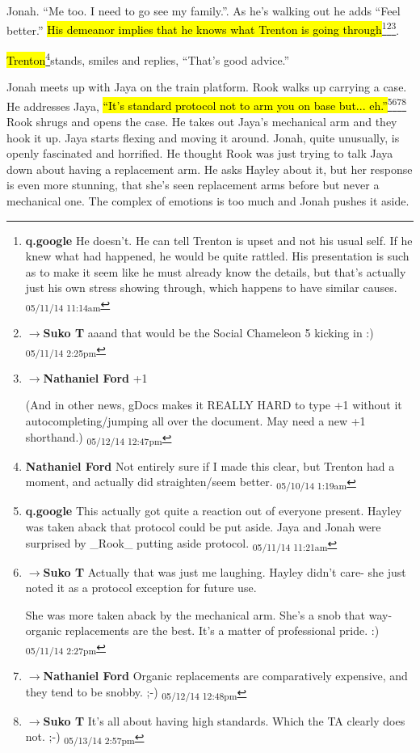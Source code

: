 Jonah.  ``Me too.  I need to go see my family.''.  As he's walking out he adds ``Feel better.''  \hl{His demeanor implies that he knows what Trenton is going through}\footnote{\textbf{q.google }He doesn't.  He can tell Trenton is upset and not his usual self.  If he knew what had happened, he would be quite rattled.  His presentation is such as to make it seem like he must already know the details, but that's actually just his own stress showing through, which happens to have similar causes. \textsubscript{05/11/14 11:14am}}\footnote{$\rightarrow$\textbf{Suko T }aaand that would be the Social Chameleon 5 kicking in :) \textsubscript{05/11/14 2:25pm}}\footnote{$\rightarrow$\textbf{Nathaniel Ford }+1

(And in other news, gDocs makes it REALLY HARD to type +1 without it autocompleting/jumping all over the document. May need a new +1 shorthand.) \textsubscript{05/12/14 12:47pm}}.

\hl{Trenton}\footnote{\textbf{Nathaniel Ford }Not entirely sure if I made this clear, but Trenton had a moment, and actually did straighten/seem better. \textsubscript{05/10/14 1:19am}}stands, smiles and replies, ``That's good advice.''



Jonah meets up with Jaya on the train platform.  Rook walks up carrying a case.  He addresses Jaya, \hl{``It's standard protocol not to arm you on base but... eh.''}\footnote{\textbf{q.google }This actually got quite a reaction out of everyone present.  Hayley was taken aback that protocol could be put aside.  Jaya and Jonah were surprised by \_Rook\_ putting aside protocol. \textsubscript{05/11/14 11:21am}}\footnote{$\rightarrow$\textbf{Suko T }Actually that was just me laughing.   Hayley didn't care- she just noted it as a protocol exception for future use.  

She was more taken aback by the mechanical arm.  She's a snob that way- organic replacements are the best.  It's a matter of professional pride. :) \textsubscript{05/11/14 2:27pm}}\footnote{$\rightarrow$\textbf{Nathaniel Ford }Organic replacements are comparatively expensive, and they tend to be snobby. ;-) \textsubscript{05/12/14 12:48pm}}\footnote{$\rightarrow$\textbf{Suko T }It's all about having high standards.  Which the TA clearly does not. ;-) \textsubscript{05/13/14 2:57pm}} Rook shrugs and opens the case.  He takes out Jaya's mechanical arm and they hook it up.  Jaya starts flexing and moving it around.  Jonah, quite unusually, is openly fascinated and horrified.  He thought Rook was just trying to talk Jaya down about having a replacement arm.  He asks Hayley about it, but her response is even more stunning, that she's seen replacement arms before but never a mechanical one.  The complex of emotions is too much and Jonah pushes it aside.


